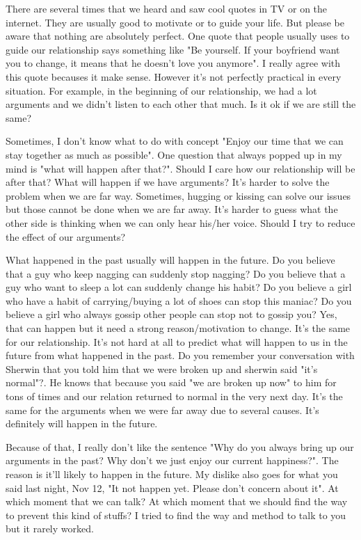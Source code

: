 
There are several times that we heard and saw cool quotes in TV or on the internet. They are usually good to motivate or to guide your life. But please be aware that nothing are absolutely perfect. One quote that people usually uses to guide our relationship says something like "Be yourself. If your boyfriend want you to change, it means that he doesn't love you anymore". I really agree with this quote becauses it make sense. However it's not perfectly practical in every situation. For example, in the beginning of our relationship, we had a lot arguments and we didn't listen to each other that much. Is it ok if we are still the same?

Sometimes, I don't know what to do with concept "Enjoy our time that we can stay together as much as possible". One question that always popped up in my mind is "what will happen after that?". Should I care how our relationship will be after that? What will happen if we have arguments? It's harder to solve the problem when we are far way. Sometimes, hugging or kissing can solve our issues but those cannot be done when we are far away. It's harder to guess what the other side is thinking when we can only hear his/her voice. Should I try to reduce the effect of our arguments? 

What happened in the past usually will happen in the future. Do you believe that a guy who keep nagging can suddenly stop nagging? Do you believe that a guy who want to sleep a lot can suddenly change his habit? Do you believe a girl who have a habit of carrying/buying a lot of shoes can stop this maniac? Do you believe a girl who always gossip other people can stop not to gossip you? Yes, that can happen but it need a strong reason/motivation to change. It's the same for our relationship. It's not hard at all to predict what will happen to us in the future from what happened in the past. Do you remember your conversation with Sherwin that you told him that we were broken up and sherwin said "it's normal"?. He knows that because you said "we are broken up now" to him for tons of times and our relation returned to normal in the very next day. It's the same for the arguments when we were far away due to several causes. It's definitely will happen in the future.

Because of that, I really don't like the sentence "Why do you always bring up our arguments in the past? Why don't we just enjoy our current happiness?". The reason is it'll likely to happen in the future. My dislike also goes for what you said last night, Nov 12, "It not happen yet. Please don't concern about it". At which moment that we can talk? At which moment that we should find the way to prevent this kind of stuffs? I tried to find the way and method to talk to you but it rarely worked.


